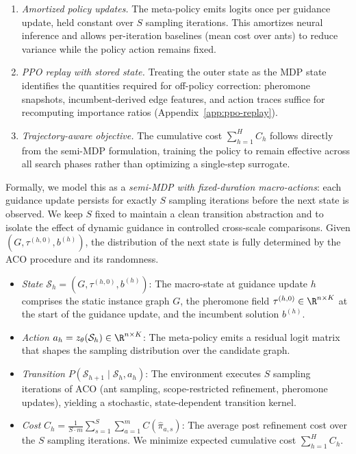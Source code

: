 \documentclass[sigconf]{acmart}
\begin{document}
\begin{enumerate}
\item \emph{Amortized policy updates.} The meta-policy emits logits once per guidance update, held constant over $S$ sampling iterations. This amortizes neural inference and allows per-iteration baselines (mean cost over ants) to reduce variance while the policy action remains fixed.
\item \emph{PPO replay with stored state.} Treating the outer state as the MDP state identifies the quantities required for off-policy correction: pheromone snapshots, incumbent-derived edge features, and action traces suffice for recomputing importance ratios (Appendix~\ref{app:ppo-replay}).
\item \emph{Trajectory-aware objective.} The cumulative cost $\sum_{h=1}^H C_h$ follows directly from the semi-MDP formulation, training the policy to remain effective across all search phases rather than optimizing a single-step surrogate.
\end{enumerate}

Formally, we model this as a \emph{semi-MDP with fixed-duration macro-actions}: each guidance update persists for exactly $S$ sampling iterations before the next state is observed.
We keep $S$ fixed to maintain a clean transition abstraction and to isolate the effect of dynamic guidance in controlled cross-scale comparisons.
Given $(G, \tau^{(h,0)}, b^{(h)})$, the distribution of the next state is fully determined by the ACO procedure and its randomness.
\begin{itemize}
\item \emph{State} $\mathcal{S}_h = (G, \tau^{(h,0)}, b^{(h)})$: The macro-state at guidance update $h$ comprises the static instance graph $G$, the pheromone field $\tau^{(h,0)} \in \R^{n \times K}$ at the start of the guidance update, and the incumbent solution $b^{(h)}$.

\item \emph{Action} $a_h = z_\theta(\mathcal{S}_h) \in \R^{n \times K}$: The meta-policy emits a residual logit matrix that shapes the sampling distribution over the candidate graph.

\item \emph{Transition} $P(\mathcal{S}_{h+1} \mid \mathcal{S}_h, a_h)$: The environment executes $S$ sampling iterations of ACO (ant sampling, scope-restricted refinement, pheromone updates), yielding a stochastic, state-dependent transition kernel.

\item \emph{Cost} $C_h = \frac{1}{S \cdot m} \sum_{s=1}^{S} \sum_{a=1}^{m} C(\hat{\pi}_{a,s})$: The average post refinement cost over the $S$ sampling iterations.  We minimize expected cumulative cost $\sum_{h=1}^H C_h$.
\end{itemize}
\end{document}
